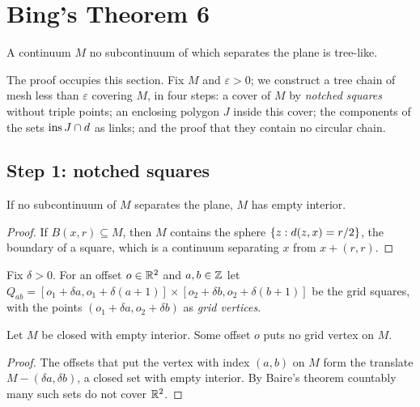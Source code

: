 \section{Bing's Theorem 6}

\begin{theorem}[Bing]\label{thm:bing6}
A continuum $M$ no subcontinuum of which separates the plane is tree-like.
\end{theorem}

The proof occupies this section. Fix $M$ and $\varepsilon>0$; we construct a tree chain of mesh less
than $\varepsilon$ covering $M$, in four steps: a cover of $M$ by \emph{notched squares} without triple
points; an enclosing polygon $J$ inside this cover; the components of the sets $\operatorname{ins} J\cap d$ as
links; and the proof that they contain no circular chain.

\subsection*{Step 1: notched squares}

\begin{lemma}\label{lem:no-interior}
If no subcontinuum of $M$ separates the plane, $M$ has empty interior.
\end{lemma}

\begin{proof}
If $B(x,r)\subseteq M$, then $M$ contains the sphere $\left\{ z:d(z,x)=r/2 \right\}$, the boundary of a square,
which is a continuum separating $x$ from $x+(r,r)$.
\end{proof}


Fix $\delta>0$. For an offset $o\in\mathbb{R}^2$ and $a,b\in\mathbb{Z}$ let
$Q_{ab}=[o_1+\delta a,o_1+\delta(a+1)]\times[o_2+\delta b,o_2+\delta(b+1)]$ be the grid squares, with
the points $(o_1+\delta a,o_2+\delta b)$ as \emph{grid vertices}.

\begin{lemma}\label{lem:offset}
Let $M$ be closed with empty interior. Some offset $o$ puts no grid vertex on $M$.
\end{lemma}

\begin{proof}
The offsets that put the vertex with index $(a,b)$ on $M$ form the translate $M-(\delta a,\delta b)$,
a closed set with empty interior. By Baire's theorem countably many such sets do not cover $\mathbb{R}^2$.
\end{proof}

